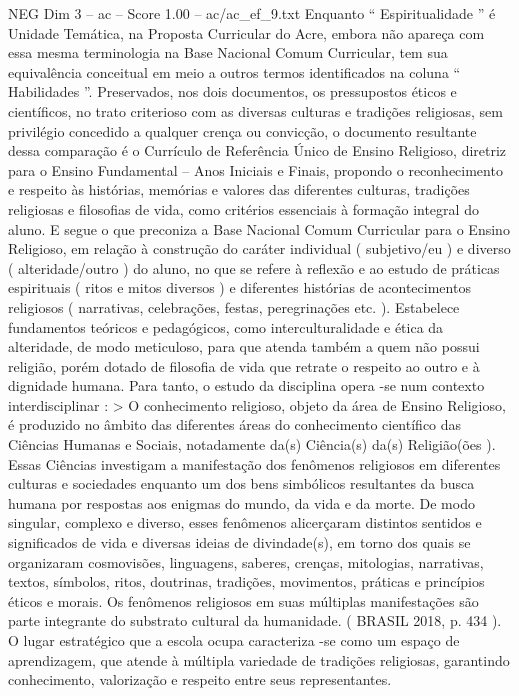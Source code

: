 \begin{textsample}{NEG Dim 3 – ac – Score 1.00 – ac/ac\_ef\_9.txt}
Enquanto “ Espiritualidade ” é Unidade Temática, na Proposta Curricular do Acre, embora não apareça com essa mesma terminologia na Base Nacional Comum Curricular, tem sua equivalência conceitual em meio a outros termos identificados na coluna “ Habilidades ”.
Preservados, nos dois documentos, os pressupostos éticos e científicos, no trato criterioso com as diversas culturas e tradições religiosas, sem privilégio concedido a qualquer crença ou convicção, o documento resultante dessa comparação é o Currículo de Referência Único de Ensino Religioso, diretriz para o Ensino Fundamental – Anos Iniciais e Finais, propondo o reconhecimento e respeito às histórias, memórias e valores das diferentes culturas, tradições religiosas e filosofias de vida, como critérios essenciais à formação integral do aluno.
E segue o que preconiza a Base Nacional Comum Curricular para o Ensino Religioso, em relação à construção do caráter individual ( subjetivo/eu ) e diverso ( alteridade/outro ) do aluno, no que se refere à reflexão e ao estudo de práticas espirituais ( ritos e mitos diversos ) e diferentes histórias de acontecimentos religiosos ( narrativas, celebrações, festas, peregrinações etc. ).
Estabelece fundamentos teóricos e pedagógicos, como interculturalidade e ética da alteridade, de modo meticuloso, para que atenda também a quem não possui religião, porém dotado de filosofia de vida que retrate o respeito ao outro e à dignidade humana.
Para tanto, o estudo da disciplina opera -se num contexto interdisciplinar : > O conhecimento religioso, objeto da área de Ensino Religioso, é produzido no âmbito das diferentes áreas do conhecimento científico das Ciências Humanas e Sociais, notadamente da(s) Ciência(s) da(s) Religião(ões ).
Essas Ciências investigam a manifestação dos fenômenos religiosos em diferentes culturas e sociedades enquanto um dos bens simbólicos resultantes da busca humana por respostas aos enigmas do mundo, da vida e da morte.
De modo singular, complexo e diverso, esses fenômenos alicerçaram distintos sentidos e significados de vida e diversas ideias de divindade(s), em torno dos quais se organizaram cosmovisões, linguagens, saberes, crenças, mitologias, narrativas, textos, símbolos, ritos, doutrinas, tradições, movimentos, práticas e princípios éticos e morais.
Os fenômenos religiosos em suas múltiplas manifestações são parte integrante do substrato cultural da humanidade. ( BRASIL 2018, p. 434 ).
O lugar estratégico que a escola ocupa caracteriza -se como um espaço de aprendizagem, que atende à múltipla variedade de tradições religiosas, garantindo conhecimento, valorização e respeito entre seus representantes.

\end{textsample}
